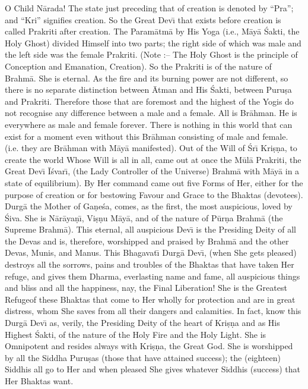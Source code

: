 O Child N\=arada! The state just preceding that of creation is denoted by ``Pra''; and ``Kri'' signifies creation. So the Great Dev\={\i} that exists before creation is called Prakriti after creation. The Param\=atm\=a by His Yoga (i.e., M\=ay\=a \'Sakti, the Holy Ghost) divided Himself into two parts; the right side of which was male and the left side was the female Prakriti.
(Note :-- The Holy Ghost is the principle of Conception and Emanation, Creation). So the Prakriti is of the nature of Brahm\=a. She is eternal. As the fire and its burning power are not different, so there is no separate distinction between \=Atman and His \'Sakti, between Puru\d{s}a and Prakriti. Therefore those that are foremost and the highest of the Yogis do not recognise any difference between a male and a female. All is Br\=ahman. He is everywhere as male and female forever. There is nothing in this world that can exist for a moment even without this Br\=ahman consisting of male and female. (i.e. they are Br\=ahman with M\=ay\=a manifested). Out of the Will of \'Sr\={\i} Kri\d{s}\d{n}a, to create the world Whose Will is all in all, came out at once the M\=ul\=a Prakriti, the Great Dev\={\i} \=I\'svar\={\i}, (the Lady Controller of the Universe) Brahm\=a with M\=ay\=a in a state of equilibrium). By Her command came out five Forms of Her, either for the purpose of creation or for bestowing Favour and Grace to the Bhaktas (devotees). Durg\=a the Mother of Ga\d{n}e\'sa, comes, as the first, the most auspicious, loved by \'Siva. She is N\=ar\=aya\d{n}\={\i}, Vi\d{s}\d{n}u M\=ay\=a, and of the nature of P\=ur\d{n}a Brahm\=a (the Supreme Brahm\=a). This eternal, all auspicious Dev\={\i} is the Presiding Deity of all the Devas and is, therefore, worshipped and praised by Brahm\=a and the other Devas, Munis, and Manus. This Bhagavat\={\i} Durg\=a Dev\={\i}, (when She gets pleased) destroys all the sorrows, pains and troubles of the Bhaktas that have taken Her refuge, and gives them Dharma, everlasting name and fame, all auspicious things and bliss and all the happiness, nay, the Final Liberation! She is the Greatest Refugeof these Bhaktas that come to Her wholly for protection and are in great distress, whom She saves from all their dangers and calamities. In fact, know this Durg\=a Dev\={\i} as, verily, the Presiding Deity of the heart of Kri\d{s}\d{n}a and as His Highest \'Sakti, of the nature of the Holy Fire and the Holy Light. She is Omnipotent and resides always with Kri\d{s}\d{n}a, the Great God. She is worshipped by all the Siddha Puru\d{s}as (those that have attained success); the (eighteen) Siddhis all go to Her and when pleased She gives whatever Siddhis (success) that Her Bhaktas want.

